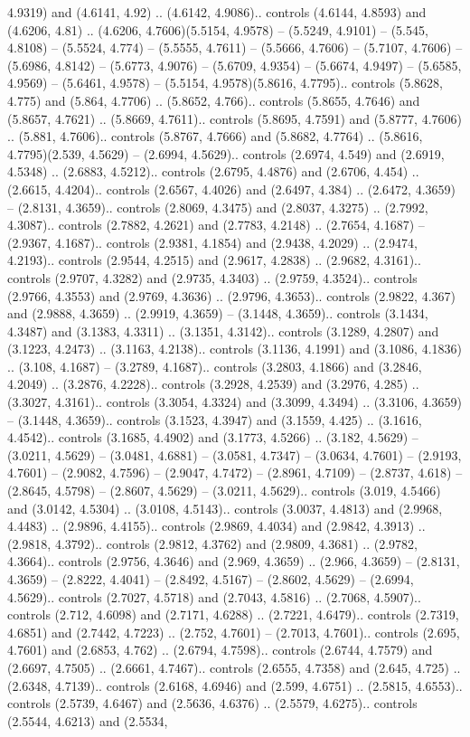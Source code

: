 4.9319) and (4.6141, 4.92) .. (4.6142, 4.9086).. controls (4.6144, 4.8593) and (4.6206, 4.81) .. (4.6206, 4.7606)(5.5154, 4.9578) -- (5.5249, 4.9101) -- (5.545, 4.8108) -- (5.5524, 4.774) -- (5.5555, 4.7611) -- (5.5666, 4.7606) -- (5.7107, 4.7606) -- (5.6986, 4.8142) -- (5.6773, 4.9076) -- (5.6709, 4.9354) -- (5.6674, 4.9497) -- (5.6585, 4.9569) -- (5.6461, 4.9578) -- (5.5154, 4.9578)(5.8616, 4.7795).. controls (5.8628, 4.775) and (5.864, 4.7706) .. (5.8652, 4.766).. controls (5.8655, 4.7646) and (5.8657, 4.7621) .. (5.8669, 4.7611).. controls (5.8695, 4.7591) and (5.8777, 4.7606) .. (5.881, 4.7606).. controls (5.8767, 4.7666) and (5.8682, 4.7764) .. (5.8616, 4.7795)(2.539, 4.5629) -- (2.6994, 4.5629).. controls (2.6974, 4.549) and (2.6919, 4.5348) .. (2.6883, 4.5212).. controls (2.6795, 4.4876) and (2.6706, 4.454) .. (2.6615, 4.4204).. controls (2.6567, 4.4026) and (2.6497, 4.384) .. (2.6472, 4.3659) -- (2.8131, 4.3659).. controls (2.8069, 4.3475) and (2.8037, 4.3275) .. (2.7992, 4.3087).. controls (2.7882, 4.2621) and (2.7783, 4.2148) .. (2.7654, 4.1687) -- (2.9367, 4.1687).. controls (2.9381, 4.1854) and (2.9438, 4.2029) .. (2.9474, 4.2193).. controls (2.9544, 4.2515) and (2.9617, 4.2838) .. (2.9682, 4.3161).. controls (2.9707, 4.3282) and (2.9735, 4.3403) .. (2.9759, 4.3524).. controls (2.9766, 4.3553) and (2.9769, 4.3636) .. (2.9796, 4.3653).. controls (2.9822, 4.367) and (2.9888, 4.3659) .. (2.9919, 4.3659) -- (3.1448, 4.3659).. controls (3.1434, 4.3487) and (3.1383, 4.3311) .. (3.1351, 4.3142).. controls (3.1289, 4.2807) and (3.1223, 4.2473) .. (3.1163, 4.2138).. controls (3.1136, 4.1991) and (3.1086, 4.1836) .. (3.108, 4.1687) -- (3.2789, 4.1687).. controls (3.2803, 4.1866) and (3.2846, 4.2049) .. (3.2876, 4.2228).. controls (3.2928, 4.2539) and (3.2976, 4.285) .. (3.3027, 4.3161).. controls (3.3054, 4.3324) and (3.3099, 4.3494) .. (3.3106, 4.3659) -- (3.1448, 4.3659).. controls (3.1523, 4.3947) and (3.1559, 4.425) .. (3.1616, 4.4542).. controls (3.1685, 4.4902) and (3.1773, 4.5266) .. (3.182, 4.5629) -- (3.0211, 4.5629) -- (3.0481, 4.6881) -- (3.0581, 4.7347) -- (3.0634, 4.7601) -- (2.9193, 4.7601) -- (2.9082, 4.7596) -- (2.9047, 4.7472) -- (2.8961, 4.7109) -- (2.8737, 4.618) -- (2.8645, 4.5798) -- (2.8607, 4.5629) -- (3.0211, 4.5629).. controls (3.019, 4.5466) and (3.0142, 4.5304) .. (3.0108, 4.5143).. controls (3.0037, 4.4813) and (2.9968, 4.4483) .. (2.9896, 4.4155).. controls (2.9869, 4.4034) and (2.9842, 4.3913) .. (2.9818, 4.3792).. controls (2.9812, 4.3762) and (2.9809, 4.3681) .. (2.9782, 4.3664).. controls (2.9756, 4.3646) and (2.969, 4.3659) .. (2.966, 4.3659) -- (2.8131, 4.3659) -- (2.8222, 4.4041) -- (2.8492, 4.5167) -- (2.8602, 4.5629) -- (2.6994, 4.5629).. controls (2.7027, 4.5718) and (2.7043, 4.5816) .. (2.7068, 4.5907).. controls (2.712, 4.6098) and (2.7171, 4.6288) .. (2.7221, 4.6479).. controls (2.7319, 4.6851) and (2.7442, 4.7223) .. (2.752, 4.7601) -- (2.7013, 4.7601).. controls (2.695, 4.7601) and (2.6853, 4.762) .. (2.6794, 4.7598).. controls (2.6744, 4.7579) and (2.6697, 4.7505) .. (2.6661, 4.7467).. controls (2.6555, 4.7358) and (2.645, 4.725) .. (2.6348, 4.7139).. controls (2.6168, 4.6946) and (2.599, 4.6751) .. (2.5815, 4.6553).. controls (2.5739, 4.6467) and (2.5636, 4.6376) .. (2.5579, 4.6275).. controls (2.5544, 4.6213) and (2.5534, 